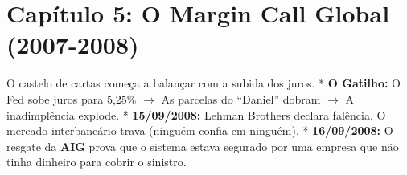 \documentclass[
  portuguese,
  letterpaper,
  DIV=11,
  numbers=noendperiod,
  oneside]{scrartcl}
\begin{document}
\section{Capítulo 5: O Margin Call Global
(2007-2008)}\label{capuxedtulo-5-o-margin-call-global-2007-2008}

O castelo de cartas começa a balançar com a subida dos juros. *
\textbf{O Gatilho:} O Fed sobe juros para 5,25\% \(\rightarrow\) As
parcelas do ``Daniel'' dobram \(\rightarrow\) A inadimplência explode. *
\textbf{15/09/2008:} Lehman Brothers declara falência. O mercado
interbancário trava (ninguém confia em ninguém). * \textbf{16/09/2008:}
O resgate da \textbf{AIG} prova que o sistema estava segurado por uma
empresa que não tinha dinheiro para cobrir o sinistro.

\section{}\label{section}
\end{document}
